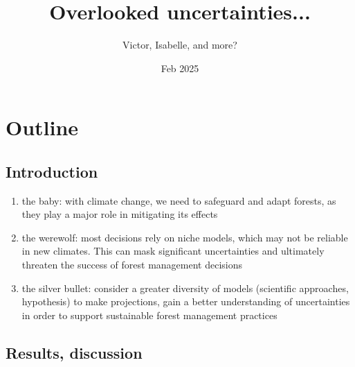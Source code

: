 \documentclass[11pt,letter]{article}
\title{Overlooked uncertainties...}
\author{Victor, Isabelle, and more?}
\date{Feb 2025}
\begin{document}
\maketitle

\section*{Outline}

\subsection*{Introduction}

\begin{enumerate}

\item the baby: with climate change, we need to safeguard and adapt forests, as they play a major role in mitigating its effects

\item the werewolf: most decisions rely on niche models, which may not be reliable in new climates. This can mask significant uncertainties and ultimately threaten the success of forest management decisions

\item the silver bullet: consider a greater diversity of models (scientific approaches, hypothesis) to make projections, gain a better understanding of uncertainties in order to support sustainable forest management practices


\end{enumerate}


\subsection*{Results, discussion}
\end{document}
